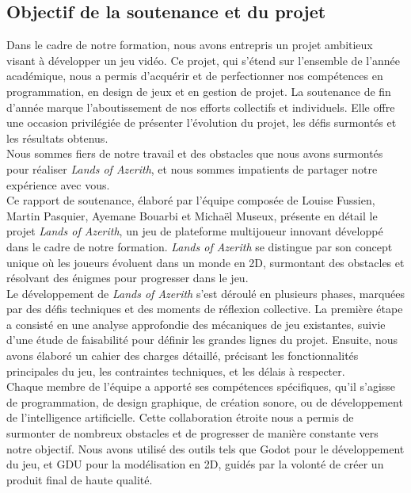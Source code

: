 

\subsection{Objectif de la soutenance et du projet}



Dans le cadre de notre formation, nous avons entrepris un projet ambitieux visant à développer un jeu vidéo.
Ce projet, qui s'étend sur l'ensemble de l'année académique, nous a permis d'acquérir et de perfectionner nos compétences en programmation,
en design de jeux et en gestion de projet. La soutenance de fin d'année marque l'aboutissement de nos efforts collectifs et individuels.
Elle offre une occasion privilégiée de présenter l'évolution du projet, les défis surmontés et les résultats obtenus.
\\

Nous sommes fiers de notre travail et des obstacles que nous avons surmontés pour réaliser \textit{Lands of Azerith},
et nous sommes impatients de partager notre expérience avec vous.
\\

Ce rapport de soutenance, élaboré par l'équipe composée de Louise Fussien, Martin Pasquier, Ayemane Bouarbi et Michaël Museux, présente
en détail le projet \textit{Lands of Azerith}, un jeu de plateforme multijoueur innovant développé dans le cadre de notre formation. \textit{Lands of Azerith}  se distingue par son concept unique
où les joueurs évoluent dans un monde en 2D, surmontant des obstacles et résolvant des énigmes pour progresser dans le jeu.
\\

Le développement de \textit{Lands of Azerith}  s'est déroulé en plusieurs phases, marquées par des défis techniques et des moments de réflexion collective.
La première étape a consisté en une analyse approfondie des mécaniques de jeu existantes, suivie d'une étude de faisabilité pour définir les grandes lignes du projet.
Ensuite, nous avons élaboré un cahier des charges détaillé, précisant les fonctionnalités principales du jeu, les contraintes techniques, et les délais à respecter.
\\

Chaque membre de l'équipe a apporté ses compétences spécifiques, qu'il s'agisse de programmation, de design graphique, de création sonore, ou de développement de
l'intelligence artificielle. Cette collaboration étroite nous a permis de surmonter de nombreux obstacles et de progresser de manière constante vers notre objectif.
Nous avons utilisé des outils tels que Godot pour le développement du jeu, et GDU pour la modélisation en 2D, guidés par la volonté de créer un produit final de haute qualité.
\\

